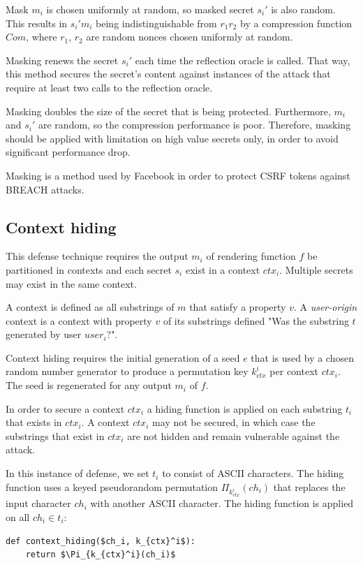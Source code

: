 \documentclass{sig-alternate-05-2015}
\begin{document}
Mask $m_i$ is chosen uniformly at random, so masked secret $s_i'$ is also
random. This results in $s_i' m_i$ being indistinguishable from $r_1 r_2$ by a
compression function $Com$, where $r_1$, $r_2$ are random nonces chosen
uniformly at random.

Masking renews the secret $s_i'$ each time the reflection oracle is called. That
way, this method secures the secret's content against instances of the attack
that require at least two calls to the reflection oracle.

Masking doubles the size of the secret that is being protected. Furthermore,
$m_i$ and $s_i'$ are random, so the compression performance is poor. Therefore,
masking should be applied with limitation on high value secrets only, in order
to avoid significant performance drop.

Masking is a method used by Facebook \cite{c11} in order to protect CSRF tokens
against BREACH attacks.

\subsection{Context hiding}
This defense technique requires the output $m_i$ of rendering function $f$ be
partitioned in contexts and each secret $s_i$ exist in a context $ctx_i$.
Multiple secrets may exist in the same context.

A context is defined as all substrings of $m$ that satisfy a property $v$. A
\textit{user-origin} context is a context with property $v$ of its substrings
defined "Was the substring $t$ generated by user $user_i$?".

Context hiding requires the initial generation of a seed $e$ that is used by a
chosen random number generator to produce a permutation key $k_{ctx}^i$ per
context $ctx_i$. The seed is regenerated for any output $m_i$ of $f$.

In order to secure a context $ctx_i$ a hiding function is applied on each
substring $t_i$ that exists in $ctx_i$. A context $ctx_i$ may not be secured, in
which case the substrings that exist in $ctx_i$ are not hidden and remain
vulnerable against the attack.

In this instance of defense, we set $t_i$ to consist of ASCII characters. The
hiding function uses a keyed pseudorandom permutation $\Pi_{k_{ctx}^i}(ch_i)$
that replaces the input character $ch_i$ with another ASCII character. The
hiding function is applied on all $ch_i \in t_i$:

\begin{lstlisting}[texcl,mathescape]
def context_hiding($ch_i, k_{ctx}^i$):
    return $\Pi_{k_{ctx}^i}(ch_i)$
\end{lstlisting}
\end{document}
